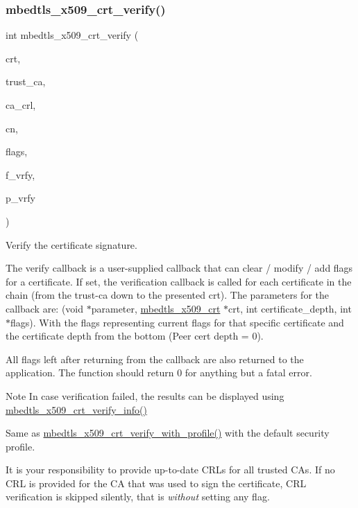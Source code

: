 \subsubsection{\texorpdfstring{mbedtls\+\_\+x509\+\_\+crt\+\_\+verify()}{mbedtls\_x509\_crt\_verify()}}
{\footnotesize\ttfamily int mbedtls\+\_\+x509\+\_\+crt\+\_\+verify (\begin{DoxyParamCaption}\item[{\mbox{\hyperlink{structmbedtls__x509__crt}{mbedtls\+\_\+x509\+\_\+crt}} $\ast$}]{crt,  }\item[{\mbox{\hyperlink{structmbedtls__x509__crt}{mbedtls\+\_\+x509\+\_\+crt}} $\ast$}]{trust\+\_\+ca,  }\item[{\mbox{\hyperlink{structmbedtls__x509__crl}{mbedtls\+\_\+x509\+\_\+crl}} $\ast$}]{ca\+\_\+crl,  }\item[{const char $\ast$}]{cn,  }\item[{uint32\+\_\+t $\ast$}]{flags,  }\item[{int($\ast$)(void $\ast$, \mbox{\hyperlink{structmbedtls__x509__crt}{mbedtls\+\_\+x509\+\_\+crt}} $\ast$, int, uint32\+\_\+t $\ast$)}]{f\+\_\+vrfy,  }\item[{void $\ast$}]{p\+\_\+vrfy }\end{DoxyParamCaption})}



Verify the certificate signature. 

The verify callback is a user-\/supplied callback that can clear / modify / add flags for a certificate. If set, the verification callback is called for each certificate in the chain (from the trust-\/ca down to the presented crt). The parameters for the callback are\+: (void $\ast$parameter, \mbox{\hyperlink{structmbedtls__x509__crt}{mbedtls\+\_\+x509\+\_\+crt}} $\ast$crt, int certificate\+\_\+depth, int $\ast$flags). With the flags representing current flags for that specific certificate and the certificate depth from the bottom (Peer cert depth = 0).

All flags left after returning from the callback are also returned to the application. The function should return 0 for anything but a fatal error.

\begin{DoxyNote}{Note}
In case verification failed, the results can be displayed using {\ttfamily \mbox{\hyperlink{group__x509__module_gae88f1d8e6696eb2beeffe0a708219e6b}{mbedtls\+\_\+x509\+\_\+crt\+\_\+verify\+\_\+info()}}} 

Same as {\ttfamily \mbox{\hyperlink{group__x509__module_gaf044a51e5b5bc854bf12aeeccb440e55}{mbedtls\+\_\+x509\+\_\+crt\+\_\+verify\+\_\+with\+\_\+profile()}}} with the default security profile.

It is your responsibility to provide up-\/to-\/date C\+R\+Ls for all trusted C\+As. If no C\+RL is provided for the CA that was used to sign the certificate, C\+RL verification is skipped silently, that is {\itshape without} setting any flag.
\end{DoxyNote}

